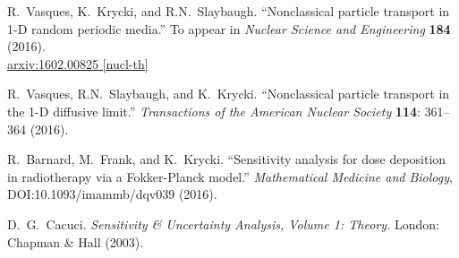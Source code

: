 \documentclass[12pt]{article}
\begin{document}
\begin{thebibliography}{10}
R.~Vasques, K.~Krycki, and R.N.~Slaybaugh.
``Nonclassical particle transport in 1-D random periodic media.''
To appear in \textit{Nuclear Science and Engineering} \textbf{184} (2016).\\
\href{http://arxiv.org/pdf/1602.00825v2.pdf}{arxiv:1602.00825 [nucl-th]} \vspace{-5pt}

R.~Vasques, R.N.~Slaybaugh, and K.~Krycki.
``Nonclassical particle transport in the 1-D diffusive limit.''
\textit{Transactions of the American Nuclear Society} \textbf{114}: 361--364 (2016).
\vspace{-5pt}

R.~Barnard, M.~Frank, and K.~Krycki.
``Sensitivity analysis for dose deposition in radiotherapy via a Fokker-Planck model.''
\textit{Mathematical Medicine and Biology}, DOI:10.1093/imammb/dqv039 (2016).
\vspace{-5pt}

D.~G.~Cacuci. \textit{Sensitivity \& Uncertainty Analysis, Volume 1: Theory.}
London: Chapman \& Hall (2003).


\end{thebibliography}
\end{document}
